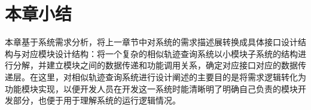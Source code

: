 
\section{本章小结}
\label{sec:design conclusion}
本章基于系统需求分析，将上一章节中对系统的需求描述展转换成具体接口设计结构与对应模块设计结构：将一个复杂的相似轨迹查询系统以小模块子系统的结构进行分解，并建立模块之间的数据传递和功能调用关系，确定对应接口对应的数据传递层。在这里，对相似轨迹查询系统进行设计阐述的主要目的是将需求逻辑转化为功能模块实现，以便开发人员在开发这一系统时能清晰明了明确自己负责的模块开发部分，也便于用于理解系统的运行逻辑情况。

